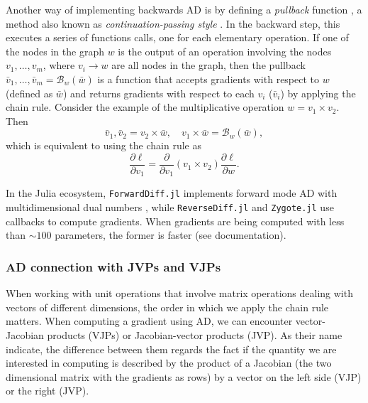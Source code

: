 Another way of implementing backwards AD is by defining a \textit{pullback} function \cite{Innes_2018}, a method also known as \textit{continuation-passing style} \cite{Wang_Zheng_Decker_Wu_Essertel_Rompf_2019}. In the backward step, this executes a series of functions calls, one for each elementary operation.
If one of the nodes in the graph $w$ is the output of an operation involving the nodes $v_1, \ldots, v_m$, where $v_i \rightarrow w$ are all nodes in the graph, then the pullback $\bar v_1, \ldots, \bar v_m = \mathcal B_w(\bar w)$ is a function that accepts gradients with respect to $w$ (defined as $\bar w$) and returns gradients with respect to each $v_i$ ($\bar v_i$) by applying the chain rule. Consider the example of the multiplicative operation $w = v_1 \times v_2$. Then
\begin{equation}
 \bar v_1, \bar v_2 = v_2 \times \bar w , \quad
 v_1 \times \bar w = \mathcal{B}_w (\bar w),
\end{equation}
which is equivalent to using the chain rule as
\begin{equation}
 \frac{\partial \ell}{\partial v_1} = \frac{\partial}{\partial v_1}(v_1 \times v_2) \frac{\partial \ell}{\partial w}.
\end{equation}

In the Julia ecosystem, \texttt{ForwardDiff.jl} implements forward mode AD with multidimensional dual numbers \cite{RevelsLubinPapamarkou2016},
while \texttt{ReverseDiff.jl} and \texttt{Zygote.jl} use callbacks to compute gradients. When gradients are being computed with less than $\sim 100$ parameters, the former is faster (see documentation).

\subsubsection{AD connection with JVPs and VJPs}

When working with unit operations that involve matrix operations dealing with vectors of different dimensions, the order in which we apply the chain rule matters. When computing a gradient using AD, we can encounter vector-Jacobian products (VJPs) or Jacobian-vector products (JVP). As their name indicate, the difference between them regards the fact if the quantity we are interested in computing is described by the product of a Jacobian (the two dimensional matrix with the gradients as rows) by a vector on the left
side (VJP) or the right (JVP).

